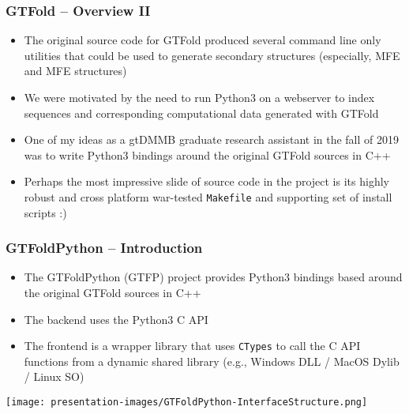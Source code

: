 \documentclass[usenames,svgnames,dvipsnames,11pt]{beamer}
\begin{document}
\begin{frame}
\frametitle{GTFold -- Overview II}

\begin{itemize} 

\item The original source code for GTFold produced several command line only utilities 
      that could be used to generate secondary structures (especially, MFE and MFE structures) 
\item We were motivated by the need to run Python3 on a webserver to index sequences and corresponding computational 
      data generated with GTFold 
\item One of my ideas as a gtDMMB graduate research assistant in the fall of 2019 was to write Python3 bindings around the 
      original GTFold sources in C++
\item Perhaps the most impressive slide of source code in the project is its highly robust and cross platform 
      war-tested \texttt{Makefile} and supporting set of install scripts :)

\end{itemize}

\end{frame}

\begin{frame}
\frametitle{GTFoldPython -- Introduction}

\begin{itemize} 

\item The GTFoldPython (GTFP) project provides Python3 bindings based around the 
      original GTFold sources in C++
\item The backend uses the Python3 C API 
\item The frontend is a wrapper library that uses 
      \texttt{CTypes} to call the C API functions from a dynamic shared library 
      (e.g., Windows DLL / MacOS Dylib / Linux SO) 

\end{itemize}

\begin{center}
\texttt{[image: presentation-images/GTFoldPython-InterfaceStructure.png]}
\end{center}

\end{frame}
\end{document}

